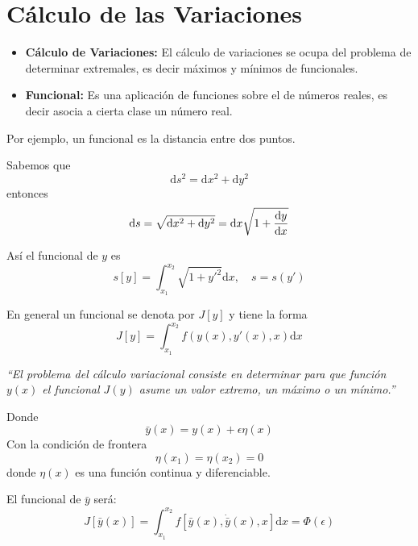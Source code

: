 \documentclass[../main]{subfiles}
\begin{document}
\section{Cálculo de las Variaciones}
\begin{itemize}
    \item \textbf{Cálculo de Variaciones:} El cálculo de variaciones se ocupa del problema de determinar extremales, es decir máximos y mínimos de funcionales.
    \item \textbf{Funcional:} Es una aplicación de funciones sobre el de números reales, es decir asocia a cierta clase un número real.
\end{itemize}

Por ejemplo, un funcional es la distancia entre dos puntos.

Sabemos que 
\begin{equation}
    \mathrm{d}s^2=\mathrm{d}x^2+\mathrm{d}y^2
\end{equation}
entonces
\begin{equation}
    \mathrm{d}s=\sqrt{\mathrm{d}x^2+\mathrm{d}y^2}=\mathrm{d}x\sqrt{1+\dv{y}{x}}
\end{equation}

Así el funcional de $y$ es
\begin{equation}
    s[y]=\int_{x_1}^{x_2}\sqrt{1+y'^{2}}\mathrm{d}x, \quad s=s(y')
\end{equation}

En general un funcional se denota por $J[y]$ y tiene la forma
\begin{equation}
    J[y]=\int_{x_1}^{x_2}f\left(y(x), y'(x), x\right)\mathrm{d}x
\end{equation}

\textit{``El problema del cálculo variacional consiste en determinar para que función $y(x)$ el funcional $J(y)$ asume un valor extremo, un máximo o un mínimo.''}

Donde 
\begin{equation}
    \bar{y}(x)=y(x)+\epsilon\eta(x)
\end{equation}
Con la condición de frontera
\begin{equation}
    \eta(x_1)=\eta(x_2)=0
\end{equation}
donde $\eta(x)$ es una función continua y diferenciable.

El funcional de $\bar{y}$ será:
\begin{equation}
    J[\bar{y}(x)]=\int_{x_1}^{x_2} f\left[\bar{y}(x), \dot{\bar{y}}(x), x\right]\mathrm{d}x=\Phi (\epsilon)
\end{equation}
\end{document}
